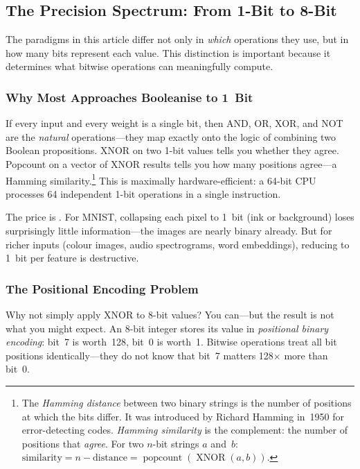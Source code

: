 \subsection{The Precision Spectrum: From 1-Bit to 8-Bit}
\label{sec:precision-spectrum}

The paradigms in this article differ not only in \emph{which}
operations they use, but in how many bits represent each value.
This distinction is important because it determines what bitwise
operations can meaningfully compute.

\subsubsection{Why Most Approaches Booleanise to 1~Bit}

If every input and every weight is a single bit, then AND, OR, XOR,
and NOT are the \emph{natural} operations---they map exactly onto
the logic of combining two Boolean propositions. XNOR on two 1-bit
values tells you whether they agree. Popcount on a vector of XNOR
results tells you how many positions agree---a Hamming
similarity.\footnote{The \emph{Hamming distance} between two binary
strings is the number of positions at which the bits differ. It was
introduced by Richard Hamming in~1950 for error-detecting codes.
\emph{Hamming similarity} is the complement: the number of positions
that \emph{agree}. For two $n$-bit strings $a$ and~$b$:
$\text{similarity} = n - \text{distance}
= \operatorname{popcount}(\operatorname{XNOR}(a,b))$.}
This is maximally hardware-efficient: a 64-bit CPU processes 64
independent 1-bit operations in a single instruction.

The price is . For MNIST, collapsing each
pixel to 1~bit (ink or background) loses surprisingly little
information---the images are nearly binary already. But for richer
inputs (colour images, audio spectrograms, word embeddings),
reducing to 1~bit per feature is destructive.

\subsubsection{The Positional Encoding Problem}

Why not simply apply XNOR to 8-bit values? You can---but the
result is not what you might expect. An 8-bit integer stores its
value in \emph{positional binary encoding}: bit~7 is worth~128,
bit~0 is worth~1. Bitwise operations treat all bit positions
identically---they do not know that bit~7 matters 128$\times$ more
than bit~0.

